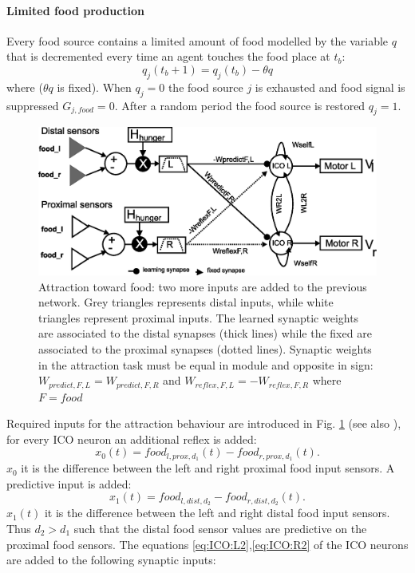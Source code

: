 \paragraph{Limited food production}
Every food source contains a limited amount of food modelled by the variable $q$ that
 is decremented every time an agent touches the food place at $t_{b}$:
\begin{equation}
q_{j}(t_{b}+1)=q_{j}(t_{b})-\theta q
\label{eq:qfood}
\end{equation}
where ($\theta q$ is fixed).
When $q_{j}=0$ the food source $j$ is exhausted and food signal is suppressed $G_{j,food}=0$.
After a random period the food source is restored $q_{j}=1$.
\begin{figure}[htb]
\includegraphics[scale=0.4]{figures/socialadapt/attractionFood.eps}
\vspace*{4pt}
\small{
\caption[Attraction learning behaviour for food]{Attraction toward food:
two more inputs are added to the previous network. Grey triangles represents
distal inputs, while white triangles represent proximal inputs.
The learned synaptic weights are associated to the distal synapses (thick lines)
 while the fixed are associated to the proximal synapses (dotted lines).
Synaptic weights in the attraction task must be equal in module and opposite
in sign: $W_{predict,F,L}=W_{predict,F,R}$ and $W_{reflex,F,L}=-W_{reflex,F,R}$
where $F=food$ \label{fig:attraction}}
}
\end{figure}

Required inputs for the attraction behaviour are introduced in
Fig. \ref{fig:attraction} (see also \citealt{Stamm2006}),
for every ICO neuron an additional reflex is added:
\begin{equation}
x_{0}(t)=food_{l,prox,d_{1}}(t)-food_{r,prox,d_{1}}(t).
\end{equation}
$x_{0}$ it is the difference between the left and right proximal food input sensors.
A predictive input is added:
\begin{equation}
x_{1}(t)=food_{l,dist,d_{2}}-food_{r,dist,d_{2}}(t).
\end{equation}
$x_{1}(t)$ it is the difference between the left and right distal food input sensors.
Thus $d_{2}>d_{1}$ such that the distal food sensor values are
predictive on the proximal food sensors.
The equations \ref{eq:ICO:L2},\ref{eq:ICO:R2} of the ICO neurons are added to the
following synaptic inputs:

